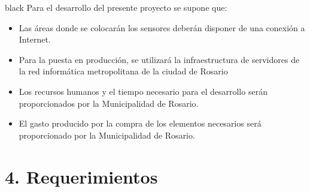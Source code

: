 \documentclass[11pt]{charter}
\begin{document}
\begin{consigna}{black}
Para el desarrollo del presente proyecto se supone que:

\begin{itemize}
\item Las áreas donde se colocarán los sensores deberán disponer de una conexión a Internet.
\item Para la puesta en producción, se utilizará la infraestructura de servidores de la red informática metropolitana de la ciudad de Rosario
\item Los recursos humanos y el tiempo necesario para el desarrollo serán proporcionados por la Municipalidad de Rosario.
\item El gasto producido por la compra de los elementos necesarios será proporcionado por la Municipalidad de Rosario.
\end{itemize}

\end{consigna}

\section{4. Requerimientos}
\label{sec:requerimientos}
\end{document}
